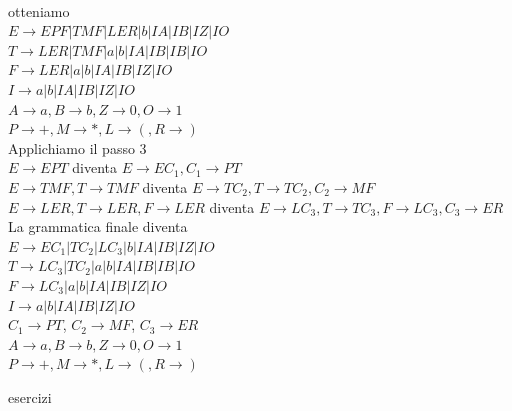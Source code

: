 \documentclass[12pt]{article}
\begin{document}
\vspace{5mm}
\\ otteniamo 
\\ $E\rightarrow EPF | TMF | LER | b | IA | IB | IZ | IO   $
\\ $T\rightarrow LER | TMF | a | b | IA | IB | IB | IO$
\\ $F\rightarrow LER | a | b | IA | IB | IZ | IO$
\\ $I\rightarrow a | b | IA | IB | IZ | IO $
\\ $A \rightarrow a, B \rightarrow b, Z \rightarrow 0, O \rightarrow 1 $
\\ $P \rightarrow +, M \rightarrow *, L \rightarrow (, R \rightarrow ) $
\vspace{5mm}
\\ Applichiamo il passo 3
\\ $E \rightarrow EPT$ diventa $E \rightarrow EC_1, C_1 \rightarrow PT$
\vspace{2mm}
\\ $E \rightarrow TMF, T \rightarrow TMF$ diventa $E \rightarrow TC_2,T \rightarrow TC_2, C_2 \rightarrow MF$
\vspace{2mm}
\\ $E \rightarrow LER, T \rightarrow LER, F \rightarrow LER$ diventa $E \rightarrow LC_3,T \rightarrow TC_3, F \rightarrow LC_3, C_3 \rightarrow ER$
\vspace{5mm}
\\ La grammatica finale diventa 
\\ $E\rightarrow EC_1 | TC_2 | LC_3 | b | IA | IB | IZ | IO   $
\\ $T\rightarrow LC_3 | TC_2 | a | b | IA | IB | IB | IO$
\\ $F\rightarrow LC_3 | a | b | IA | IB | IZ | IO$
\\ $I\rightarrow a | b | IA | IB | IZ | IO $
\\ $C_1 \rightarrow PT$, $C_2 \rightarrow MF$, $C_3 \rightarrow ER$
\\ $A \rightarrow a, B \rightarrow b, Z \rightarrow 0, O \rightarrow 1 $
\\ $P \rightarrow +, M \rightarrow *, L \rightarrow (, R \rightarrow ) $


\newpage
{esercizi}
\end{document}
